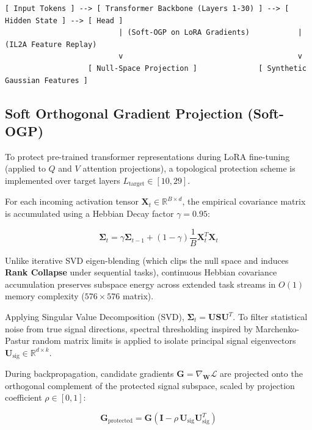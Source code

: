 \documentclass[11pt,a4paper]{article}
\begin{document}
\begin{verbatim}
[ Input Tokens ] --> [ Transformer Backbone (Layers 1-30) ] --> [ Hidden State ] --> [ Head ]
                          | (Soft-OGP on LoRA Gradients)           | (IL2A Feature Replay)
                          v                                        v
                   [ Null-Space Projection ]              [ Synthetic Gaussian Features ]
\end{verbatim}

\subsection{Soft Orthogonal Gradient Projection (Soft-OGP)}

To protect pre-trained transformer representations during LoRA fine-tuning (applied to $Q$ and $V$ attention projections), a topological protection scheme is implemented over target layers $L_{\text{target}} \in [10, 29]$.

For each incoming activation tensor $\mathbf{X}_t \in \mathbb{R}^{B \times d}$, the empirical covariance matrix is accumulated using a Hebbian Decay factor $\gamma = 0.95$:

\begin{equation}
\boldsymbol{\Sigma}_{t} = \gamma \boldsymbol{\Sigma}_{t-1} + (1 - \gamma) \frac{1}{B} \mathbf{X}_t^T \mathbf{X}_t
\end{equation}

Unlike iterative SVD eigen-blending (which clips the null space and induces \textbf{Rank Collapse} under sequential tasks), continuous Hebbian covariance accumulation preserves subspace energy across extended task streams in $O(1)$ memory complexity ($576 \times 576$ matrix).

Applying Singular Value Decomposition (SVD), $\boldsymbol{\Sigma}_t = \mathbf{U} \mathbf{S} \mathbf{U}^T$. To filter statistical noise from true signal directions, spectral thresholding inspired by Marchenko-Pastur random matrix limits \citep{ledoit2011eigenvectors} is applied to isolate principal signal eigenvectors $\mathbf{U}_{\text{sig}} \in \mathbb{R}^{d \times k}$.

During backpropagation, candidate gradients $\mathbf{G} = \nabla_{\mathbf{W}} \mathcal{L}$ are projected onto the orthogonal complement of the protected signal subspace, scaled by projection coefficient $\rho \in [0, 1]$:

\begin{equation}
\mathbf{G}_{\text{protected}} = \mathbf{G}(\mathbf{I} - \rho \, \mathbf{U}_{\text{sig}} \mathbf{U}_{\text{sig}}^T)
\end{equation}
\end{document}

